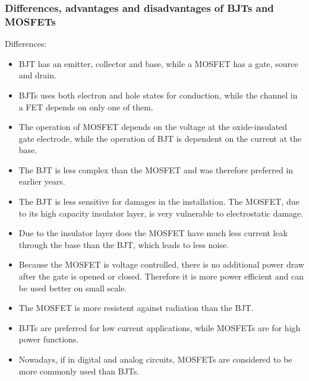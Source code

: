 \documentclass[11pt]{article}
\begin{document}
\subsubsection{Differences, advantages and disadvantages of BJTs and MOSFETs}
Differences:
\begin{itemize}
 \item BJT has an emitter, collector and base, while a MOSFET has a gate, source and drain.
 \item BJTs uses both electron and hole states for conduction, while the channel in a FET depends on only one of them.
 \item The operation of MOSFET depends on the voltage at the oxide-insulated gate electrode, while the operation of BJT is dependent on the current at the base.
 \item The BJT is less complex than the MOSFET and was therefore preferred in earlier years.
 \item The BJT is less sensitive for damages in the installation. The MOSFET, due to its high capacity insulator layer, is very vulnerable to electrostatic damage.
 \item Due to the insulator layer does the MOSFET have much less current leak through the base than the BJT, which leads to less noise. 
 \item Because the MOSFET is voltage controlled, there is no additional power draw after the gate is opened or closed. Therefore it is more power efficient and can be used better on small scale. 
 \item The MOSFET is more resistent against radiation than the BJT. 
 \item BJTs are preferred for low current applications, while MOSFETs are for high power functions.
 \item Nowadays, if in digital and analog circuits, MOSFETs are considered to be more commonly used than BJTs.
\end{itemize}
\end{document}
